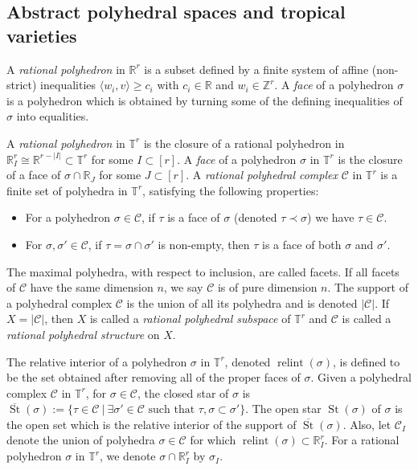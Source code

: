 \documentclass[11pt]{article}
\numberwithin{equation}{numsection}
\newcommand{\Z}{{\mathbb Z}}
\newcommand{\CC}{{\mathcal C}}
\newcommand{\R}{{\mathbb R}}
\newcommand{\TT}{{\mathbb T}}
\newcommand{\T}{{\mathbb T}}
\DeclareMathOperator{\relint}{relint}
\DeclareMathOperator{\St}{St}
\begin{document}
\subsection{Abstract polyhedral spaces and tropical varieties}

A \emph{rational polyhedron} in $\R^r$ is a subset defined by a finite system of affine (non-strict)  inequalities 
$\langle w_i, v \rangle \geq c_i$ with $c_i \in \R$ and $w_i \in \Z^r$.
A \emph{face} of a polyhedron $\sigma$ is a polyhedron which is obtained by turning some of the defining inequalities of $\sigma$ into equalities.

A \emph{rational polyhedron} in $\TT^r$ is the closure of a rational polyhedron in 
$\R^r_I \cong \R^{r - |I|} \subset \T^r$ for some $I\subset[r]$. 
A \emph{face} of a polyhedron $\sigma$ in $\T^r$ is the closure of a face of $\sigma \cap \R_J$ for some $J \subset [r]$.
A \emph{rational polyhedral complex} $\CC$ in $\TT^r$ is a finite set of polyhedra in $\TT^r$,
satisfying the following properties:
\begin{itemize}
\item[\rm (1)]
For  a polyhedron $\sigma \in \CC$, if $\tau$ is a face of $\sigma$ (denoted $\tau \prec \sigma$) we have $\tau \in \CC$. 
\item[\rm (2)]
For $\sigma, \sigma' \in \CC$, if $\tau = \sigma \cap \sigma'$ is non-empty, then $\tau$ is a face of both $\sigma $ and $\sigma'$. 
\end{itemize}
The maximal polyhedra, with respect to inclusion, are called facets.
If all facets of $\CC$ have the same dimension $n$, we say $\CC$ is of pure dimension $n$. 
The support of a polyhedral complex $\CC$  is the union of all its polyhedra and is denoted $\vert \CC \vert$. 
If $X = |\CC|$, then $X$ is called a \emph{rational polyhedral subspace} of $\T^r$ and 
$\CC$ is called a \emph{rational polyhedral structure} on $X$. 



The relative interior of a polyhedron $\sigma$ in $\T^r$, denoted $\relint(\sigma)$, is defined to be the set obtained after removing
all of the proper faces of $\sigma$.
Given a polyhedral complex $\CC$ in $\T^r$, for  $\sigma \in \CC$, the closed star of $\sigma$ is
$\overline{\St}(\sigma) := \{\tau \in \CC \ | \ \exists \sigma' \in \CC \text{ such that } \tau,\sigma \subset \sigma'\}$. 
The open star $\St(\sigma)$ of $\sigma$ is the open set which is the relative interior of the support of $\overline{\St}(\sigma)$. 
Also, let $\CC_I$ denote the union of polyhedra 
$\sigma \in \CC$ for which $\relint(\sigma) \subset \R^r_I$. 
For  a rational polyhedron  $\sigma$ in $\T^r$, 
we denote  $\sigma \cap \R^r_I$  by $\sigma_I$.  
\end{document}
